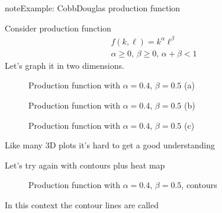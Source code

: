 \documentclass[letterpaper,10pt,english]{jupyterBook}
\begin{document}
\begin{sphinxadmonition}{note}{Example: Cobb\sphinxhyphen{}Douglas production function}

\sphinxAtStartPar
Consider production function
\begin{equation*}
\begin{split}
f(k, \ell) = k^{\alpha} \ell^{\beta}\\
\alpha \ge 0, \, \beta \ge 0, \, \alpha + \beta < 1
\end{split}
\end{equation*}
\sphinxAtStartPar
Let’s graph it in two dimensions.
\end{sphinxadmonition}

\begin{figure}[htbp]
\centering
\capstart

\noindent{}
\caption{Production function with \(\alpha=0.4\), \(\beta=0.5\) (a)}\label{\detokenize{02.optimization_intro:id6}}\end{figure}

\begin{figure}[htbp]
\centering
\capstart

\noindent{}
\caption{Production function with \(\alpha=0.4\), \(\beta=0.5\) (b)}\label{\detokenize{02.optimization_intro:id7}}\end{figure}

\begin{figure}[htbp]
\centering
\capstart

\noindent{}
\caption{Production function with \(\alpha=0.4\), \(\beta=0.5\) (c)}\label{\detokenize{02.optimization_intro:id8}}\end{figure}

\sphinxAtStartPar
Like many 3D plots it’s hard to get a good understanding

\sphinxAtStartPar
Let’s try again with contours plus heat map

\begin{figure}[htbp]
\centering
\capstart

\noindent{}
\caption{Production function with \(\alpha=0.4\), \(\beta=0.5\), contours}\label{\detokenize{02.optimization_intro:id9}}\end{figure}

\sphinxAtStartPar
In this context the contour lines are called 
\end{document}
